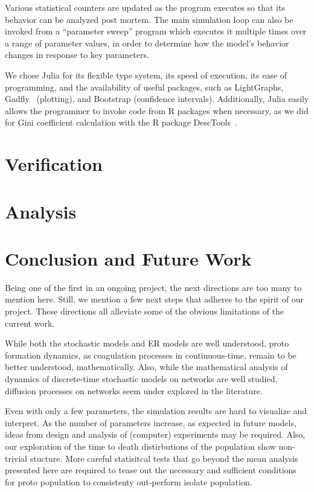 \documentclass[sigconf]{acmart}
\begin{document}
Various statistical counters are updated as the program executes so that its behavior can be analyzed post mortem. The main simulation loop can also be invoked from a ``parameter sweep'' program which executes it multiple times over a range of parameter values, in order to determine how the model's behavior changes in response to key parameters.

We chose Julia for its flexible type system, its speed of execution, its ease of programming, and the availability of useful packages, such as LightGraphs, Gadfly~\cite{Gadfly-2018} (plotting), and Bootstrap (confidence intervals).  Additionally, Julia easily allows the programmer to invoke code from R packages when necessary, as we did for Gini coefficient calculation with the R package DescTools~\cite{DescTools-2019}.


\section{Verification}


\section{Analysis}

\section{Conclusion and Future Work}
Being one of the first in an ongoing project, the next directions are too many to mention here. Still, we mention a few next steps that adheres to the spirit of our project. These directions all alleviate some of the obvious limitations of the current work. 

While both the stochastic models and ER models are well understood, proto formation dynamics, as coagulation processes in continuous-time, remain to be better understood, mathematically. Also, while the mathematical analysis of dynamics of discrete-time stochastic models on networks are well studied, diffusion processes on networks seem under explored in the literature. 

Even with only a few parameters, the simulation results are hard to visualize and interpret. As the number of parameters increase, as expected in future models, ideas from design and analysis of (computer) experiments may be required. Also, our exploration of the time to death distirbutions of the population show non-trivial stucture. More careful statisitcal tests that go beyond the mean analysis presented here are required to tease out the necessary and sufficient conditions for proto population to consistenty out-perform isolate population.   
\end{document}
